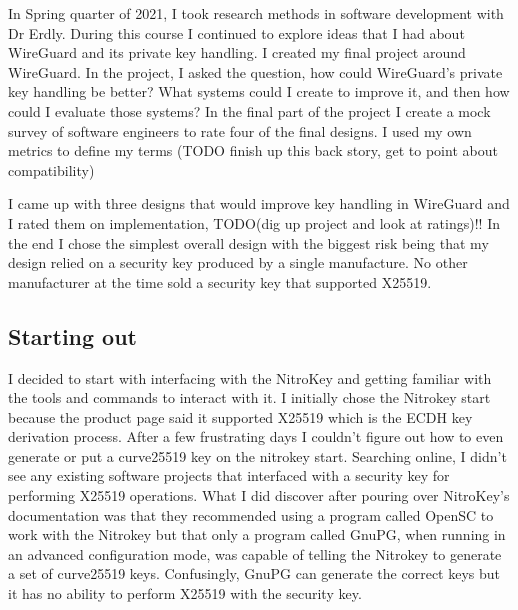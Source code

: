 \documentclass [11pt, proquest] {uwthesis}[2020/02/24]
\begin{document}
In Spring quarter of 2021, I took research methods in software development with Dr Erdly. During this course I continued to explore ideas that I had about WireGuard and its private key handling. I created my final project around WireGuard. In the project, I asked the question, how could WireGuard's private key handling be better? What systems could I create to improve it, and then how could I evaluate those systems?  
In the final part of the project I create a mock survey of software engineers to rate four of the final designs. I used my own metrics to define my terms (TODO finish up this back story, get to point about compatibility)

I came up with three designs that would improve key handling in WireGuard and I rated them on implementation, TODO(dig up project and look at ratings)!! In the end I chose the simplest overall design with the biggest risk being that my design relied on a security key produced by a single manufacture. No other manufacturer at the time sold a security key that supported X25519.

\subsection {Starting out}

I decided to start with interfacing with the NitroKey and getting familiar with the tools and commands to interact with it. I initially chose the Nitrokey start because the product page said it supported X25519\cite{noauthor_nitrokey_nodate} which is the ECDH key derivation process. After a few frustrating days I couldn't figure out how to even generate or put a curve25519 key on the nitrokey start. Searching online, I didn't see any existing software projects that interfaced with a security key for performing X25519 operations. What I did discover after pouring over NitroKey's documentation was that they recommended using a program called OpenSC to work with the Nitrokey but that only a program called GnuPG, when running in an advanced configuration mode, was capable of telling the Nitrokey to generate a set of curve25519 keys. Confusingly, GnuPG can generate the correct keys but it has no ability to perform X25519 with the security key.
\end{document}
